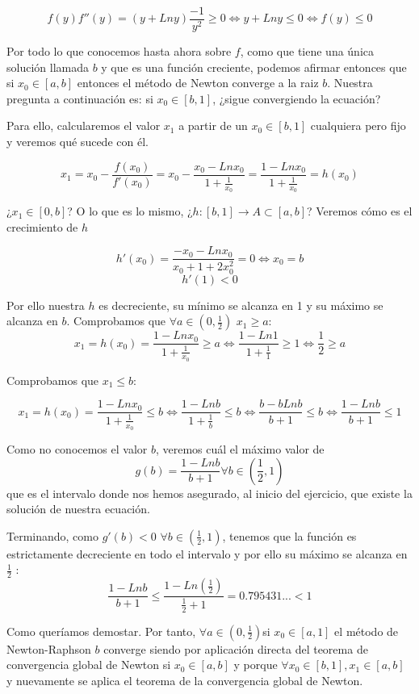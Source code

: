 \documentclass[11pt]{article}
\begin{document}
\begin{itemize}
\[
f(y)f''(y)=(y+Lny)\frac{-1}{y^2}\geq 0\iff y+Lny \leq 0 \iff f(y)\leq 0
\]

Por todo lo que conocemos hasta ahora sobre $f$, como que tiene una única solución llamada $b$ y que es una función creciente, podemos afirmar entonces que si $x_0\in[a,b]$ entonces el método de Newton converge a la raiz $b$. Nuestra pregunta a continuación es: si $x_0\in[b,1]$, ¿sigue convergiendo la ecuación?

Para ello, calcularemos el valor $x_1$ a partir de un $x_0\in[b,1]$ cualquiera pero fijo y veremos qué sucede con él.

\[
x_1=x_0-\frac{f(x_0)}{f'(x_0)}=x_0-\frac{x_0-Lnx_0}{1+\frac{1}{x_0}}=\frac{1-Lnx_0}{1+\frac{1}{x_0}}=h(x_0)
\]

¿$x_1\in[0,b]$? O lo que es lo mismo, ¿$h:[b,1]\rightarrow A \subset[a,b]$? Veremos cómo es el crecimiento de $h$

\[
h'(x_0)=\frac{-x_0-Lnx_0}{x_0+1+2x_0^2}=0 \iff x_0=b\]\[
h'(1)<0
\]

Por ello nuestra $h$ es decreciente, su mínimo se alcanza en 1 y su máximo se alcanza en $b$. Comprobamos que $\forall a\in(0,\frac{1}{2})$ $ x_1 \ge a$:
\[
x_1=h(x_0)=\frac{1-Lnx_0}{1+\frac{1}{x_0}}\ge a\iff \frac{1-Ln1}{1+\frac{1}{1}} \geq 1 \iff \frac{1}{2} \ge a 
\]

Comprobamos que $x_1\leq b$:

\[
x_1=h(x_0)=\frac{1-Lnx_0}{1+\frac{1}{x_0}}\leq b \iff \frac{1-Lnb}{1+\frac{1}{b}} \leq b \iff \frac{b-bLnb}{b+1} \leq b \iff \frac{1-Lnb}{b+1} \leq 1
\]

Como no conocemos el valor $b$, veremos cuál el máximo valor de \[g(b)=\frac{1-Lnb}{b+1} \forall b \in (\frac{1}{2},1)\] que es el intervalo donde nos hemos asegurado, al inicio del ejercicio, que existe la solución de nuestra ecuación.

Terminando, como $g'(b)<0$ $\forall b \in (\frac{1}{2},1)$, tenemos que la función es estrictamente decreciente en todo el intervalo y por ello su máximo se alcanza en $\frac{1}{2}$ :
\[\frac{1-Lnb}{b+1}\leq \frac{1-Ln(\frac{1}{2})}{\frac{1}{2}+1}=0.795431... < 1\]

Como queríamos demostar. Por tanto, $\forall a\in(0,\frac{1}{2})$si $x_0\in[a,1]$ el método de Newton-Raphson $b$ converge siendo por aplicación directa del teorema de convergencia global de Newton si $x_0 \in [a,b]$ y porque $\forall x_0 \in [b,1], x_1\in [a,b]$ y nuevamente se aplica el teorema de la convergencia global de Newton.
\end{itemize}
\end{document}
